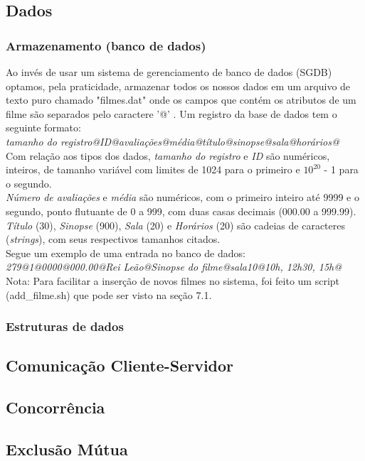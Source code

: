 \documentclass[11pt,twoside]{article}
\begin{document}
\subsection{Dados}
\subsubsection{Armazenamento (banco de dados)}
Ao invés de usar um sistema de gerenciamento de banco de dados (SGDB) optamos, pela praticidade, armazenar todos os nossos dados em um arquivo de texto puro chamado "filmes.dat" onde os campos que contém os atributos de um filme são separados pelo caractere '@' . Um registro da base de dados tem o seguinte formato:\\
\textit{tamanho do registro@ID@avaliações@média@título@sinopse@sala@horários@}\\
Com relação aos tipos dos dados, \textit{tamanho do registro} e \textit{ID} são numéricos, inteiros, de tamanho variável com limites de 1024 para o primeiro e $10^{20}$ - 1 para o segundo.\\
\textit{Número de avaliações} e \textit{média} são numéricos, com o primeiro inteiro até 9999 e o segundo, ponto flutuante de 0 a 999, com duas casas decimais (000.00 a 999.99).\\
\textit{Título} (30), \textit{Sinopse} (900), \textit{Sala} (20) e \textit{Horários} (20) são cadeias de caracteres (\textit{strings}), com seus respectivos tamanhos citados.\\
Segue um exemplo de uma entrada no banco de dados:\\
\textit{279@1@0000@000.00@Rei Leão@Sinopse do filme@sala10@10h, 12h30, 15h@}\\
Nota: Para facilitar a inserção de novos filmes no sistema, foi feito um script (add\_filme.sh) que pode ser visto na seção 7.1.
\subsubsection{Estruturas de dados}


\subsection{Comunicação Cliente-Servidor}
\subsection{Concorrência}
\subsection{Exclusão Mútua}
\end{document}
